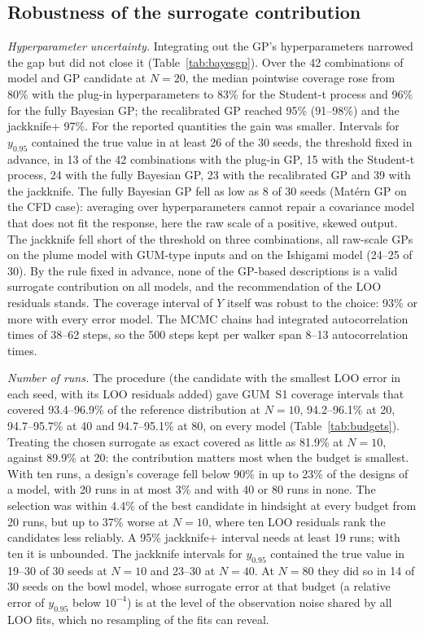 \subsection{Robustness of the surrogate contribution}
\label{sec:res-robust}
\emph{Hyperparameter uncertainty.} Integrating out the GP's hyperparameters
narrowed the gap but did not close it (Table~\ref{tab:bayesgp}). Over the 42
combinations of model and GP candidate at $N=20$, the median pointwise
coverage rose from 80\% with the plug-in hyperparameters to 83\% for the
Student-t process and 96\% for the fully Bayesian GP; the recalibrated GP
reached 95\% (91--98\%) and the jackknife+ 97\%. For the reported quantities
the gain was smaller. Intervals for $y_{0.95}$ contained the true value in
at least 26 of the 30 seeds, the threshold fixed in advance, in 13 of the 42
combinations with the plug-in GP, 15 with the Student-t process, 24 with
the fully Bayesian GP, 23 with the recalibrated GP and 39 with the
jackknife. The fully Bayesian GP fell as low as 8 of 30 seeds (Mat\'ern GP
on the CFD case): averaging over hyperparameters cannot repair a covariance
model that does not fit the response, here the raw scale of a positive,
skewed output. The jackknife fell short of the threshold on three
combinations, all raw-scale GPs on the plume model with GUM-type inputs
and on the Ishigami model (24--25 of 30). By the rule fixed in advance,
none of the GP-based descriptions is a valid surrogate contribution on all
models, and the recommendation of the LOO residuals stands. The coverage
interval of $Y$ itself was robust to the choice: 93\% or more with every
error model. The MCMC chains had integrated autocorrelation times of 38--62
steps, so the 500 steps kept per walker span 8--13 autocorrelation times.

\emph{Number of runs.} The procedure (the candidate with the smallest LOO
error in each seed, with its LOO residuals added) gave GUM~S1 coverage
intervals that covered 93.4--96.9\% of the reference distribution at
$N=10$, 94.2--96.1\% at 20, 94.7--95.7\% at 40 and 94.7--95.1\% at 80, on
every model (Table~\ref{tab:budgets}). Treating the chosen surrogate as
exact covered as little as 81.9\% at $N=10$, against 89.9\% at 20: the
contribution matters most when the budget is smallest. With ten runs, a
design's coverage fell below 90\% in up to 23\% of the designs of a model,
with 20 runs in at most 3\% and with 40 or 80 runs in none. The selection
was within 4.4\% of the best candidate in hindsight at every budget from 20
runs, but up to 37\% worse at $N=10$, where ten LOO residuals rank the
candidates less reliably. A 95\% jackknife+ interval needs at least 19 runs;
with ten it is unbounded. The jackknife intervals for $y_{0.95}$ contained
the true value in 19--30 of 30 seeds at $N=10$ and 23--30 at $N=40$. At
$N=80$ they did so in 14 of 30 seeds on the bowl model, whose surrogate
error at that budget (a relative error of $y_{0.95}$ below $10^{-4}$) is at
the level of the observation noise shared by all LOO fits, which no
resampling of the fits can reveal.

